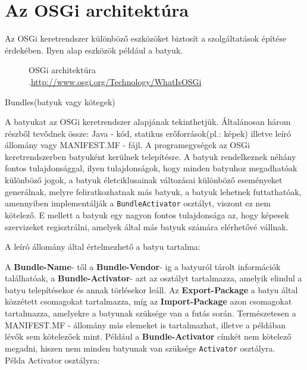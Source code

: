 \section{Az OSGi architektúra}\label{sec:MAT:muv}

Az OSGi keretrendszer különböző eszközöket biztosít a szolgáltatások építése érdekében. Ilyen alap eszközök például a batyuk.

\begin{figure}[t]
  \centering
  \caption[OSGi architektura]%
  {OSGi architektúra\\
  {\white .}\hfill\url{http://www.osgi.org/Technology/WhatIsOSGi}}
  \label{fig:ALAP:sm1}
\end{figure}

Bundles(batyuk vagy kötegek)

A batyukat az OSGi keretrendszer alapjának tekinthetjük. Általánosan három részből tevődnek össze: Java - kód, statikus erőforrások(pl.: képek) illetve leíró állomány vagy MANIFEST.MF - fájl. A programegységek az OSGi keretrendszerben batyuként kerülnek telepítésre. A batyuk rendelkeznek néhány fontos tulajdonsággal, ilyen tulajdonságok, hogy minden batyuhoz megadhatóak különböző jogok, a batyuk életciklusainak változásai különböző eseményeket generálnak, melyre feliratkozhatnak más batyuk, a batyuk lehetnek futtathatóak, amennyiben implementálják a \texttt{BundleActivator} osztályt, viszont ez nem kötelező. E mellett a batyuk egy nagyon fontos tulajdonsága az, hogy képesek szervizeket regisztrálni, amelyek által más batyuk számára elérhetővé vállnak.

A leíró állomány által értelmezhető a batyu tartalma:

 
A \textbf{Bundle-Name}- től a \textbf{Bundle-Vendor}- ig a batyuról tárolt információk találhatóak, a \textbf{Bundle-Activator}- azt az osztályt tartalmazza, amelyik elindul a batyu telepítésekor és annak törlésekor leáll. Az \textbf{Export-Package} a batyu által közzétett csomagokat tartalmazza, míg az \textbf{Import-Package} azon csomagokat tartalmazza, amelyekre a batyunak szüksége van a futás során. Természetesen a MANIFEST.MF - állomány más elemeket is tartalmazhat, illetve a példában lévők sem kötelezőek mint. Például a \textbf{Bundle-Activator} címkét nem kötelező megadni, hiszen nem minden batyunak van szüksége \texttt{Activator} osztályra. \\Példa Activator osztályra:
\
\lstset{language=Java}


